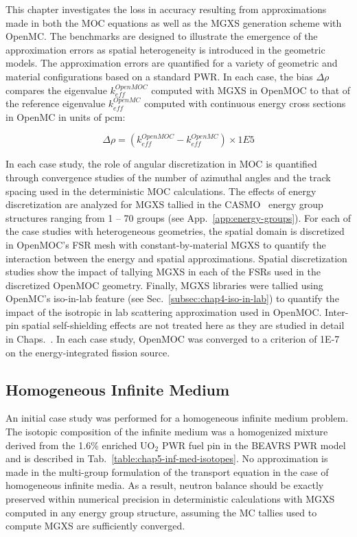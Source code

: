 This chapter investigates the loss in accuracy resulting from approximations made in both the \ac{MOC} equations as well as the \ac{MGXS} generation scheme with OpenMC. The benchmarks are designed to illustrate the emergence of the approximation errors as spatial heterogeneity is introduced in the geometric models. The approximation errors are quantified for a variety of geometric and material configurations based on a standard \ac{PWR}. In each case, the bias $\Delta\rho$ compares the eigenvalue $k_{eff}^{OpenMOC}$ computed with \ac{MGXS} in OpenMOC to that of the reference eigenvalue $k_{eff}^{OpenMC}$ computed with continuous energy cross sections in OpenMC in units of \ac{pcm}:

\begin{equation}
\label{eqn:chap5-delta-rho}
\Delta\rho = \left(k_{eff}^{OpenMOC} - k_{eff}^{OpenMC}\right) \times 1E5
\end{equation}

In each case study, the role of angular discretization in \ac{MOC} is quantified through convergence studies of the number of azimuthal angles and the track spacing used in the deterministic \ac{MOC} calculations. The effects of energy discretization are analyzed for \ac{MGXS} tallied in the CASMO~\cite{rhodes2006casmo} energy group structures ranging from 1 -- 70 groups (see App.~\ref{app:energy-groups}). For each of the case studies with heterogeneous geometries, the spatial domain is discretized in OpenMOC's \ac{FSR} mesh with constant-by-material \ac{MGXS} to quantify the interaction between the energy and spatial approximations. Spatial discretization studies show the impact of tallying \ac{MGXS} in each of the \ac{FSR}s used in the discretized OpenMOC geometry. Finally, \ac{MGXS} libraries were tallied using OpenMC's iso-in-lab feature (see Sec.~\ref{subsec:chap4-iso-in-lab}) to quantify the impact of the isotropic in lab scattering approximation used in OpenMOC. Inter-pin spatial self-shielding effects are not treated here as they are studied in detail in Chaps.~. In each case study, OpenMOC was converged to a criterion of 1E-7 on the energy-integrated fission source.

\subsection{Homogeneous Infinite Medium}
\label{subsec:chap5-inf-medium}

An initial case study was performed for a homogeneous infinite medium problem. The isotopic composition of the infinite medium was a homogenized mixture derived from the 1.6\% enriched UO$_2$ \ac{PWR} fuel pin in the \ac{BEAVRS} \ac{PWR} model~\cite{horelik2013beavrs} and is described in Tab.~\ref{table:chap5-inf-med-isotopes}. No approximation is made in the multi-group formulation of the transport equation in the case of homogeneous infinite media. As a result, neutron balance should be exactly preserved within numerical precision in deterministic calculations with \ac{MGXS} computed in any energy group structure, assuming the \ac{MC} tallies used to compute \ac{MGXS} are sufficiently converged.

